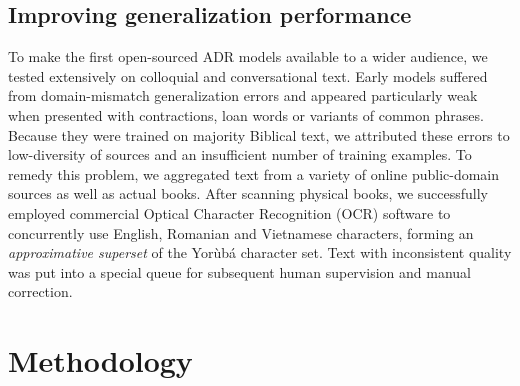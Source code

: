 \documentclass{article} %
\begin{document}

\subsection{Improving generalization performance}

To make the first open-sourced ADR models available to a wider audience, we tested extensively on colloquial and conversational text. Early models \citep{orife2018adr} suffered from domain-mismatch generalization errors and appeared particularly weak when presented with contractions, loan words or variants of common phrases. Because they were trained on majority Biblical text, we attributed these errors to low-diversity of sources and an insufficient number of training examples. To remedy this problem, we aggregated text from a variety of online public-domain sources as well as actual books. After scanning physical books, we successfully employed commercial Optical Character Recognition (OCR) software to concurrently use English, Romanian and Vietnamese characters, forming an \emph{approximative superset} of the Yor{\`u}b{\'a} character set. Text with inconsistent quality was put into a special queue for subsequent human supervision and manual correction. 

\section{Methodology}\label{sec:methods}


\end{document}
